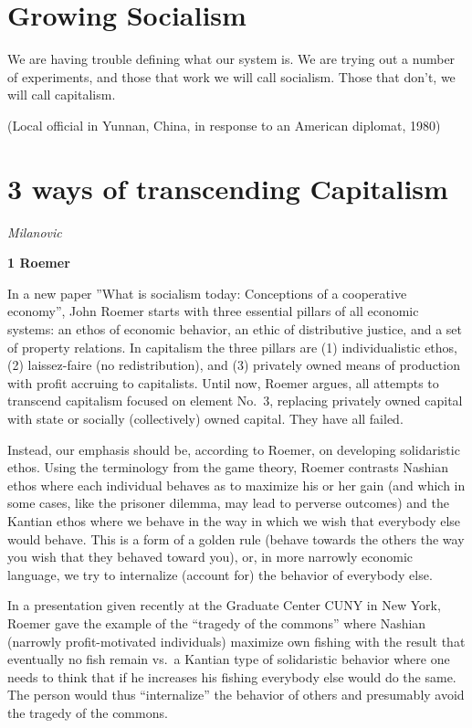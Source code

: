 \documentclass[
]{book}
\begin{document}
\hypertarget{growing-socialism}{%
\section{Growing Socialism}\label{growing-socialism}}

We are having trouble defining what our system is. We are trying out a number of experiments, and those that work we will call socialism. Those that don't, we will call capitalism.

(Local official in Yunnan, China, in response to an American diplomat, 1980)

\hypertarget{ways-of-transcending-capitalism}{%
\section{3 ways of transcending Capitalism}\label{ways-of-transcending-capitalism}}

\emph{Milanovic}

\textbf{1 Roemer}

In a new paper ''What is socialism today: Conceptions of a cooperative economy'', John Roemer starts with three essential pillars of all economic systems: an ethos of economic behavior, an ethic of distributive justice, and a set of property relations. In capitalism the three pillars are (1) individualistic ethos, (2) laissez-faire (no redistribution), and (3) privately owned means of production with profit accruing to capitalists. Until now, Roemer argues, all attempts to transcend capitalism focused on element No.~3, replacing privately owned capital with state or socially (collectively) owned capital. They have all failed.

Instead, our emphasis should be, according to Roemer, on developing solidaristic ethos. Using the terminology from the game theory, Roemer contrasts Nashian ethos where each individual behaves as to maximize his or her gain (and which in some cases, like the prisoner dilemma, may lead to perverse outcomes) and the Kantian ethos where we behave in the way in which we wish that everybody else would behave. This is a form of a golden rule (behave towards the others the way you wish that they behaved toward you), or, in more narrowly economic language, we try to internalize (account for) the behavior of everybody else.

In a presentation given recently at the Graduate Center CUNY in New York, Roemer gave the example of the ``tragedy of the commons'' where Nashian (narrowly profit-motivated individuals) maximize own fishing with the result that eventually no fish remain vs.~a Kantian type of solidaristic behavior where one needs to think that if he increases his fishing everybody else would do the same. The person would thus ``internalize'' the behavior of others and presumably avoid the tragedy of the commons.
\end{document}
